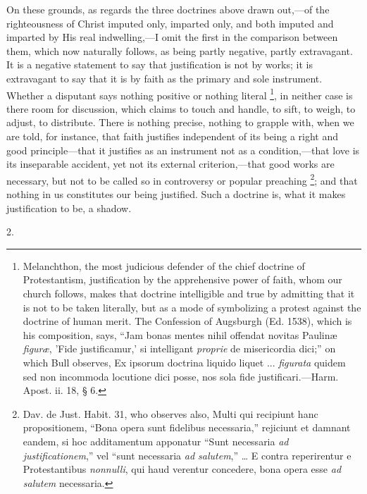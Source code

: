 On these grounds, as regards the three doctrines above drawn out,—of
the righteousness of Christ imputed only, imparted only, and both
imputed and imparted by His real indwelling,—I omit the first in the
comparison between them, which now naturally follows, as being partly
negative, partly extravagant. It is a negative statement to say that
justification is not by works; it is extravagant to say that it is by
faith as the primary and sole instrument. Whether a disputant says
nothing positive or nothing literal \footnote{Melanchthon,
the most judicious defender of the chief doctrine of Protestantism,
justification by the apprehensive power of faith, whom our church
follows, makes that doctrine intelligible and true by admitting that
it is not to be taken literally, but as a mode of symbolizing a
protest against the doctrine of human merit. The Confession of
Augsburgh (Ed. 1538), which is his composition, says, ``Jam bonas
mentes nihil offendat novitas Paulinæ \emph{figuræ}, 'Fide
justificamur,' si intelligant \emph{proprie} de misericordia dici;''
on which Bull observes, Ex ipsorum doctrina liquido liquet ... \emph{figurata}
quidem sed non incommoda locutione dici posse, nos sola fide
justificari.—Harm. Apost. ii. 18, § 6.}, in neither case is there room for discussion, which claims to
touch and handle, to sift, to weigh, to adjust, to distribute. There
is nothing precise, nothing to grapple with, when we are told, for
instance, that faith justifies independent of its being a right and
good principle—that it justifies as an instrument not as a
condition,—that love is its inseparable accident, yet not its
external criterion,—that good works are necessary, but not to be
called so in controversy or popular preaching \footnote{Dav. de Just.
Habit. 31, who observes also, Multi qui recipiunt hanc propositionem,
``Bona opera sunt fidelibus necessaria,'' rejiciunt et damnant
eandem, si hoc additamentum apponatur ``Sunt necessaria \emph{ad
justificationem},'' vel ``sunt necessaria \emph{ad salutem},''
… E contra reperirentur e Protestantibus \emph{nonnulli}, qui haud
verentur concedere, bona opera esse \emph{ad salutem} necessaria.}; and that nothing in us constitutes our being justified.
Such a doctrine is, what it makes justification to be, a shadow.

2.

